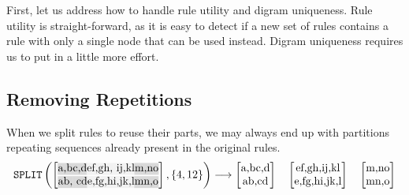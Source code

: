 \bigbreak%
First, let us address how to handle rule utility and digram uniqueness. Rule utility is straight-forward, as it is easy to detect if a new set of rules contains a rule with only a single node that can be used instead. Digram uniqueness requires us to put in a little more effort.

\subsection{Removing Repetitions}

When we split rules to reuse their parts, we may always end up with partitions repeating sequences already present in the original rules.
{
    \ttfamily
    \noindent
    \begin{align*}
        \texttt{SPLIT}\left(
        \begin{bmatrix}
            \text{\hlc{gray!30}{a,bc,d}\hlc{gray!10}{ef,gh, ij,kl}\hlc{gray!30}{m,no}}\\
            \text{\hlc{gray!30}{ab, cd}\hlc{gray!10}{e,fg,hi,jk,l}\hlc{gray!30}{mn,o}}
        \end{bmatrix}
        , \{4, 12\}
        \right)
        \longrightarrow
        \begin{bmatrix}
            \text{a,bc,d}\\
            \text{ab,cd}
        \end{bmatrix}
        \quad
        \begin{bmatrix}
            \text{ef,gh,ij,kl}\\
            \text{e,fg,hi,jk,l}
        \end{bmatrix}
        \quad
        \begin{bmatrix}
            \text{m,no}\\
            \text{mn,o}
        \end{bmatrix}
    \end{align*}
}


